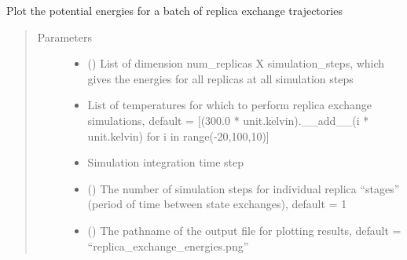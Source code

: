 \documentclass[letterpaper,12pt,english,openany,oneside]{sphinxmanual}
\begin{document}
\begin{fulllineitems}
\label{\detokenize{simulation:simulation.rep_exch.plot_replica_exchange_energies}}
Plot the potential energies for a batch of replica exchange trajectories
\begin{quote}\begin{description}
\item[{Parameters}] \leavevmode\begin{itemize}
\item {} 
 (\sphinxstyleliteralemphasis{\sphinxupquote{( }}\sphinxstyleliteralemphasis{\sphinxupquote{( }}\sphinxstyleliteralemphasis{\sphinxupquote{ ) }}\sphinxstyleliteralemphasis{\sphinxupquote{ )}}) \textendash{} List of dimension num\_replicas X simulation\_steps, which gives the energies for all replicas at all simulation steps

\item {} 
 \textendash{} List of temperatures for which to perform replica exchange simulations, default = {[}(300.0 * unit.kelvin).\_\_add\_\_(i * unit.kelvin) for i in range(-20,100,10){]}

\item {} 
 \textendash{} Simulation integration time step

\item {} 
 () \textendash{} The number of simulation steps for individual replica “stages” (period of time between state exchanges), default = 1

\item {} 
 () \textendash{} The pathname of the output file for plotting results, default = “replica\_exchange\_energies.png”


\end{itemize}
\end{description}
\end{quote}
\end{fulllineitems}
\end{document}
